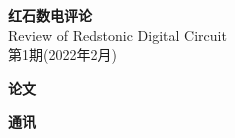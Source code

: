 \documentclass[UTF8,12pt,punct=kaiming,fontset=none]{ctexart}
\begin{document}
\thispagestyle{empty}
\BgThispage
\quad
\newpage

\quad
\vspace{-0.3cm}
\begin{center}
    \fontsize{46pt}{54.2pt} \textbf{红石数电评论} \\
    \Large Review of Redstonic Digital Circuit \\
    \Large 第1期(2022年2月)
\end{center}

\makeatletter
\newcommand{\cdotfill}{\leavevmode\cleaders\hb@xt@ 0.56cm{\hss\ensuremath{\cdots}\hss }\hfill\kern\z@}
\makeatother
{}
\setcounter{currentPageNumber}{3}
\newcommand{\addContent}{
    \setcounter{nextPageNumber}{\arabic{currentPageNumber}}
    \ifthenelse{\pageNumber>1}{
        \addtocounter{nextPageNumber}{\pageNumber}
        \addtocounter{nextPageNumber}{-1}
        \hyperlink{page.\arabic{currentPageNumber}}{\fileName\cdotfill\authorName\quad\arabic{currentPageNumber} - \arabic{nextPageNumber}}
    }{
        \hyperlink{page.\arabic{currentPageNumber}}{\fileName\cdotfill\authorName\quad\arabic{currentPageNumber}}
    }
    \bookmark[page={\arabic{currentPageNumber}}]{\fileName}
    \addtocounter{currentPageNumber}{\pageNumber}
    
}


\begin{spacing}{2.0}

\large\sffamily\bfseries 论文

\normalsize\normalfont


\large\sffamily\bfseries 通讯

\normalsize\normalfont


\end{spacing}

\vspace{1cm}
\end{document}
